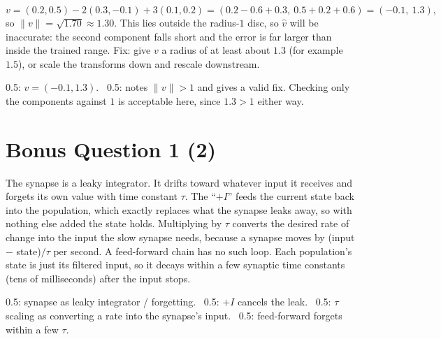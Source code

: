 \documentclass[11pt,letterpaper]{article}
\newcommand{\ans}[1]{\par\vspace{4pt}{\bfseries #1}\quad}
\begin{document}
\ans{(c) [1]}
\[
v = (0.2, 0.5) - 2(0.3, -0.1) + 3(0.1, 0.2) = (0.2 - 0.6 + 0.3,\ 0.5 + 0.2 + 0.6) = (-0.1,\ 1.3),
\]
so $\|v\| = \sqrt{1.70} \approx 1.30$.
This lies outside the radius-$1$ disc, so $\hat v$ will be inaccurate: the second component falls short and the error is far larger than inside the trained range. Fix: give $v$ a radius of at least about $1.3$ (for example $1.5$), or scale the transforms down and rescale downstream.
\begin{marking}
0.5: $v = (-0.1, 1.3)$. \ 0.5: notes $\|v\| > 1$ and gives a valid fix. Checking only the components against $1$ is acceptable here, since $1.3 > 1$ either way.
\end{marking}

\section*{Bonus Question 1 \hfill (2)}
The synapse is a leaky integrator. It drifts toward whatever input it receives and forgets its own value with time constant $\tau$. The ``$+I$'' feeds the current state back into the population, which exactly replaces what the synapse leaks away, so with nothing else added the state holds. Multiplying by $\tau$ converts the desired rate of change into the input the slow synapse needs, because a synapse moves by (input $-$ state)$/\tau$ per second. A feed-forward chain has no such loop. Each population's state is just its filtered input, so it decays within a few synaptic time constants (tens of milliseconds) after the input stops.
\begin{marking}
0.5: synapse as leaky integrator / forgetting. \ 0.5: $+I$ cancels the leak. \ 0.5: $\tau$ scaling as converting a rate into the synapse's input. \ 0.5: feed-forward forgets within a few $\tau$.
\end{marking}
\end{document}

